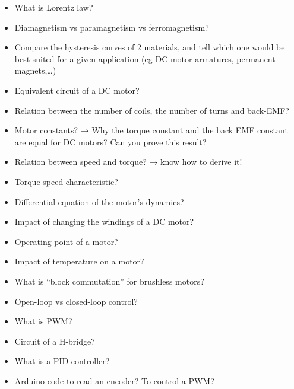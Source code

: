 \documentclass[compress]{beamer}
\begin{document}
\begin{frame}[plain]
    \begin{center}
        \begin{itemize}
        \item {What is Lorentz law?}
        \item {Diamagnetism vs paramagnetism vs ferromagnetism?}
        \item {Compare the hysteresis curves of 2 materials, and tell which one would be best suited for a given application (eg DC motor armatures, permanent magnets,…)}
        \end{itemize}
    \end{center}
\end{frame}

\begin{frame}[plain]
    \begin{center}
        \begin{itemize}
        \item {Equivalent circuit of a DC motor?}
        \item {Relation between the number of coils, the number of turns and back-EMF?}
        \item {Motor constants? → Why the torque constant and the back EMF constant are equal for DC motors? Can you prove this result?}
        \item {Relation between speed and torque? → know how to derive it!}
        \item {Torque-speed characteristic?}
        \item {Differential equation of the motor’s dynamics?}
        \item {Impact of changing the windings of a DC motor?}
        \item {Operating point of a motor?}
        \item {Impact of temperature on a motor?}
        \item {What is “block commutation” for brushless motors?}
        \end{itemize}
    \end{center}
\end{frame}

\begin{frame}[plain]
    \begin{center}
        \begin{itemize}
        \item {Open-loop vs closed-loop control?}
        \item {What is PWM?}
        \item {Circuit of a H-bridge?}
        \item {What is a PID controller?}
        \item {Arduino code to read an encoder? To control a PWM?}
        \end{itemize}
    \end{center}
\end{frame}
\end{document}
